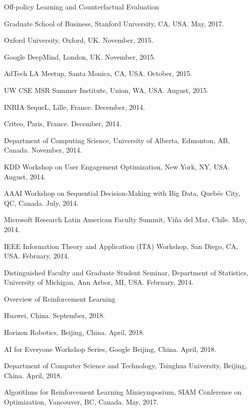 \documentclass[10pt,twoside,letterpaper]{article}
\begin{document}
\begin{compactitem}
\item{Off-policy Learning and Counterfactual Evaluation}
\begin{compactitem}
\item{Graduate School of Business, Stanford University, CA, USA.  May, 2017.}
\item{Oxford University, Oxford, UK. November, 2015.}
\item{Google DeepMind, London, UK. November, 2015.}
\item{AdTech LA Meetup, Santa Monica, CA, USA. October, 2015.}
\item{UW CSE MSR Summer Institute, Union, WA, USA. August, 2015.}
\item{INRIA SequeL, Lille, France. December, 2014.}
\item{Criteo, Paris, France. December, 2014.}
\item{Department of Computing Science, University of Alberta, Edmonton, AB, Canada.  November, 2014.}
\item{KDD Workshop on User Engagement Optimization, New York, NY, USA.  August, 2014.}
\item{AAAI Workshop on Sequential Decision-Making with Big Data, Queb{\'e}c City, QC, Canada. July, 2014.}
\item{Microsoft Research Latin American Faculty Summit, Vi\~na del Mar, Chile. May, 2014.}
\item{IEEE Information Theory and Application (ITA) Workshop, San Diego, CA, USA.  February, 2014.}
\item{Distinguished Faculty and Graduate Student Seminar, Department of Statistics, University of Michigan, Ann Arbor, MI, USA.  February, 2014.}
\end{compactitem}

\item{Overview of Reinforcement Learning}
\begin{compactitem}
\item{Huawei, China.  September, 2018.}
\item{Horizon Robotics, Beijing, China.  April, 2018.}
\item{AI for Everyone Workshop Series, Google Beijing, China.  April, 2018.}
\item{Department of Computer Science and Technology, Tsinghua University, Beijing, China.  April, 2018.}
\item{Algorithms for Reinforcement Learning Minisymposium, SIAM Conference on Optimization, Vancouver, BC, Canada.  May, 2017.}
\end{compactitem}


\end{compactitem}
\end{document}
